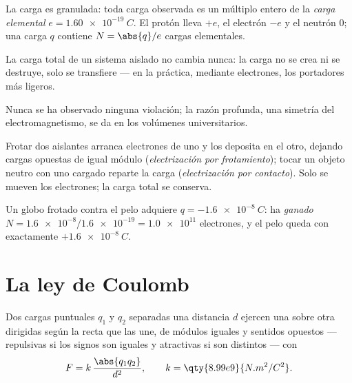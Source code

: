\begin{definition}\label{def:g11:fundamental-interactions:elementary}
La carga es granulada: toda carga observada es un múltiplo entero de la
\emph{carga elemental} $e = \qty{1.60e-19}{C}$.
El protón lleva $+e$, el electrón $-e$ y el neutrón $0$; una carga $q$
contiene $N = \abs{q}/e$ cargas elementales.
\end{definition}

\begin{proposition}\label{prop:g11:fundamental-interactions:conservation}
La carga total de un sistema aislado no cambia nunca: la carga no se
crea ni se destruye, solo se transfiere --- en la práctica, mediante
electrones, los portadores más ligeros.
\end{proposition}
\admitted

\begin{remark}\label{rem:g11:fundamental-interactions:conservation}
Nunca se ha observado ninguna violación; la razón profunda, una simetría
del electromagnetismo, se da en los volúmenes universitarios.
\end{remark}

\begin{definition}\label{def:g11:fundamental-interactions:charging}
Frotar dos aislantes arranca electrones de uno y los deposita en el
otro, dejando cargas opuestas de igual módulo (\emph{electrización por
frotamiento}); tocar un objeto
neutro con uno cargado reparte la carga (\emph{electrización por
contacto}). Solo se mueven los
electrones; la carga total se conserva.
\end{definition}

\begin{example}\label{ex:g11:fundamental-interactions:balloon}
Un globo frotado contra el pelo adquiere $q = \qty{-1.6e-8}{C}$: ha
\emph{ganado} $N = \num{1.6e-8} / \num{1.6e-19} = \num{1.0e11}$
electrones, y el pelo queda con exactamente $+\qty{1.6e-8}{C}$.
\end{example}

\section{La ley de Coulomb}

\begin{theorem}\label{thm:g11:fundamental-interactions:coulomb}
Dos cargas puntuales $q_1$ y $q_2$ separadas una distancia $d$ ejercen
una sobre otra  dirigidas según la recta que las une, de módulos
iguales y sentidos opuestos --- repulsivas si los signos son iguales y
atractivas si son distintos --- con
\[
F = k\,\frac{\abs{q_1 q_2}}{d^{2}},
\qquad k = \qty{8.99e9}{N.m^2/C^2}.
\]
\end{theorem}
\admitted

